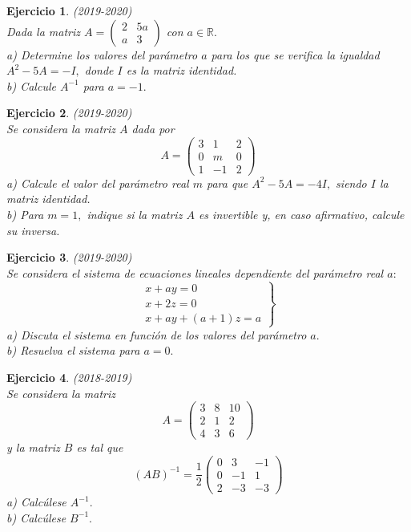 \documentclass[12pt, a4paper]{amsart}
\newtheorem{ejer}{Ejercicio}
\begin{document}
\begin{ejer}\em (2019-2020)\\
Dada la matriz $A=\begin{pmatrix}
2 & 5a
\\ a & 3\end{pmatrix}$ con $a\in\mathbb{R}.$\\
a) Determine los valores del parámetro $a$ para los que se verifica la igualdad $A^2 - 5A = -I ,$ donde $I$ es la matriz identidad.\\
b) Calcule $A^{-1}$ para $a = -1 .$
\end{ejer}

\begin{ejer}\em (2019-2020)\\
Se considera la matriz $A$ dada por
\[A=\begin{pmatrix}
3 & 1 & 2
\\ 0 & m & 0
\\ 1 & -1 & 2
\end{pmatrix}\]
a) Calcule el valor del parámetro real $m$ para que $A^2 - 5A = -4I ,$ siendo $I$ la matriz identidad.\\
b) Para $m = 1 ,$ indique si la matriz $A$ es invertible y, en caso afirmativo, calcule su inversa.
\end{ejer}

\begin{ejer}\em (2019-2020)\\
Se considera el sistema de ecuaciones lineales dependiente del parámetro real $a :$
\[
\left. \begin{matrix}
x+ay=0
\\ x+2z=0
\\  x+ay+(a+1)z=a
\end{matrix}  \right \}
\]
a) Discuta el sistema en función de los valores del parámetro $a .$\\
b) Resuelva el sistema para $a = 0 .$
\end{ejer}

\begin{ejer}\em (2018-2019)\\
Se considera la matriz
\[A=\begin{pmatrix}
3 & 8 & 10
\\ 2 & 1 & 2
\\ 4 & 3 & 6
\end{pmatrix}\]
y la matriz $B$ es tal que
\[
(AB)^{-1}=\frac{1}{2}\begin{pmatrix}
0 & 3 & -1
\\ 0 & -1 & 1
\\ 2 & -3 & -3
\end{pmatrix}
\]
a) Calcúlese $A^{-1} .$\\
b) Calcúlese $B^{-1}.$
\end{ejer}
\end{document}
